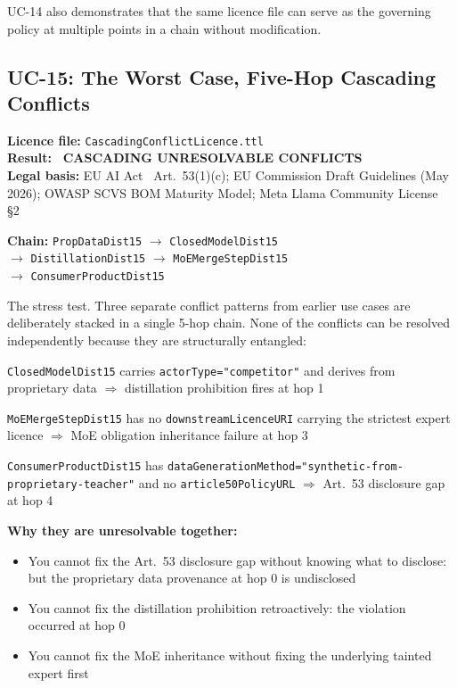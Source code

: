 \documentclass[12pt,a4paper]{article}
\newcommand{\violated}[1]{\textcolor{violation}{\textbf{\texttimes\ #1}}}
\begin{document}
UC-14 also demonstrates that the same licence file can serve as the governing policy at multiple points in a chain without modification.

\subsection{UC-15: The Worst Case, Five-Hop Cascading Conflicts}
\textbf{Licence file:} \texttt{CascadingConflictLicence.ttl}\\[2pt]
\textbf{Result:} \violated{CASCADING UNRESOLVABLE CONFLICTS}\\[4pt]
\textbf{Legal basis:} EU AI Act~\cite{euaiact2024} Art.\ 53(1)(c); EU Commission Draft Guidelines (May 2026); OWASP SCVS BOM Maturity Model; Meta Llama Community License~\cite{llamalicence} \S 2

\textbf{Chain:} \texttt{PropDataDist15} $\rightarrow$ \texttt{ClosedModelDist15}\\
\quad$\rightarrow$ \texttt{DistillationDist15} $\rightarrow$ \texttt{MoEMergeStepDist15}\\
\quad$\rightarrow$ \texttt{ConsumerProductDist15}

The stress test. Three separate conflict patterns from earlier use cases are deliberately stacked in a single 5-hop chain. None of the conflicts can be resolved independently because they are structurally entangled:

\begin{description}[leftmargin=3cm, style=nextline]
  \item[Conflict 1 (UC-6 pattern):] \texttt{ClosedModelDist15} carries \texttt{actorType="competitor"} and derives from proprietary data $\Rightarrow$ distillation prohibition fires at hop 1
  \item[Conflict 2 (UC-12 pattern):] \texttt{MoEMergeStepDist15} has no \texttt{downstreamLicenceURI} carrying the strictest expert licence $\Rightarrow$ MoE obligation inheritance failure at hop 3
  \item[Conflict 3 (UC-10 pattern):] \texttt{ConsumerProductDist15} has \texttt{dataGenerationMethod="synthetic\linebreak-from-proprietary-teacher"} and no \texttt{article50PolicyURL} $\Rightarrow$ Art.\ 53 disclosure gap at hop 4
\end{description}

\textbf{Why they are unresolvable together:}
\begin{itemize}[noitemsep]
  \item You cannot fix the Art.\ 53 disclosure gap without knowing what to disclose: but the proprietary data provenance at hop 0 is undisclosed
  \item You cannot fix the distillation prohibition retroactively: the violation occurred at hop 0
  \item You cannot fix the MoE inheritance without fixing the underlying tainted expert first
\end{itemize}
\end{document}
